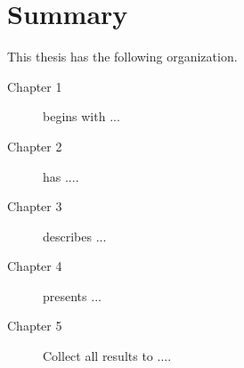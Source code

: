 
\cleardoublepage
\chapter*{Summary}
\noindent
This thesis has the following organization.
\begin{description}
% 
% 

\item[Chapter 1] begins with ...

\item[Chapter 2] has ....

\item[Chapter 3] describes ...

\item[Chapter 4] presents ...

\item[Chapter 5] Collect all results to ....

\end{description}%